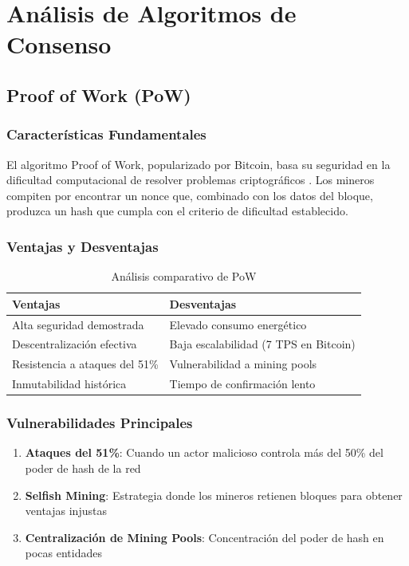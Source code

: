 \documentclass[spanish,12pt,letterpaper]{report}
\begin{document}
\section{Análisis de Algoritmos de Consenso}

\subsection{Proof of Work (PoW)}

\subsubsection{Características Fundamentales}

El algoritmo Proof of Work, popularizado por Bitcoin, basa su seguridad en la dificultad computacional de resolver problemas criptográficos \cite{nakamoto2008bitcoin}. Los mineros compiten por encontrar un nonce que, combinado con los datos del bloque, produzca un hash que cumpla con el criterio de dificultad establecido.

\subsubsection{Ventajas y Desventajas}

\begin{table}[h]
\centering
\begin{tabular}{|p{6cm}|p{6cm}|}
\hline
\textbf{Ventajas} & \textbf{Desventajas} \\
\hline
Alta seguridad demostrada & Elevado consumo energético \\
Descentralización efectiva & Baja escalabilidad (7 TPS en Bitcoin) \\
Resistencia a ataques del 51\% & Vulnerabilidad a mining pools \\
Inmutabilidad histórica & Tiempo de confirmación lento \\
\hline
\end{tabular}
\caption{Análisis comparativo de PoW}
\label{tab:pow-comparison}
\end{table}

\subsubsection{Vulnerabilidades Principales}

\begin{enumerate}
    \item \textbf{Ataques del 51\%}: Cuando un actor malicioso controla más del 50\% del poder de hash de la red
    \item \textbf{Selfish Mining}: Estrategia donde los mineros retienen bloques para obtener ventajas injustas
    \item \textbf{Centralización de Mining Pools}: Concentración del poder de hash en pocas entidades
\end{enumerate}
\end{document}
